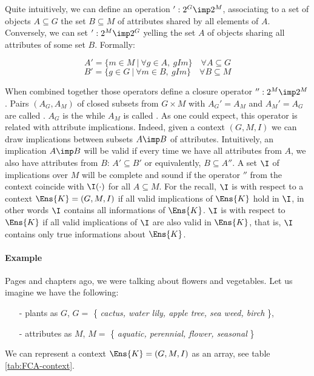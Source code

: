\vspace{1.2em}

Quite intuitively, we can define an operation $': 2^G \imp 2^M$, associating to a set of objects $A \subseteq G$ the set $B \subseteq M$ of attributes shared by
all elements of $A$. Conversely, we can set $': 2^M \imp 2^G$ yelling the set
$A$ of objects sharing all attributes of some set $B$. Formally:

\[ A' = \{ m \in M \ | \ \forall g \in A,\ gIm \} \quad \forall A \subseteq G \]
\[ B' = \{ g \in G \ | \ \forall m \in B,\ gIm \} \quad \forall B \subseteq M \]


\noindent When combined together those operators define a closure operator $'': 2^M \imp 2^M$. Pairs $(A_G, A_M)$ of closed subsets from $G \times M$ with $A_G' = A_M$ and $A_M' = A_G$ are called . $A_G$ is the  while $A_M$ is called . As one could expect, this operator is related with attribute implications. Indeed, given a context $(G, M, I)$ we can draw implications between subsets $A \imp B$ of attributes. Intuitively, an implication $A \imp B$ will be valid if every time we have all attributes from $A$, we also have
attributes from $B$: $A' \subseteq B'$ or equivalently, $B \subseteq A''$. A set
$\I$ of implications over $M$ will be complete and sound if the operator $''$ from the context coincide with $\I(\cdot)$ for all $A \subseteq M$. For the recall, $\I$ is  with respect to a context $\Ens{K} = (G, M, I)$ if all valid implications of $\Ens{K}$ hold in $\I$, in other words $\I$ contains all informations of $\Ens{K}$. $\I$ is  with respect to
$\Ens{K}$ if all valid implications of $\I$ are also valid in $\Ens{K}$, that is, $\I$ contains only true informations about $\Ens{K}$. 


\paragraph{Example} Pages and chapters ago, we were talking about flowers and
vegetables. Let us imagine we have the following:
\begin{itemize}
	\item[-] plants as $G$, $G = $ \{ \textit{cactus, water lily, apple tree, sea weed, birch} \},
	\item[-] attributes as $M$, $M = $ \{ \textit{aquatic, perennial, flower, seasonal} \}
\end{itemize}
We can represent a context $\Ens{K} = (G, M, I)$ as an array, see table \ref{tab:FCA-context}.

